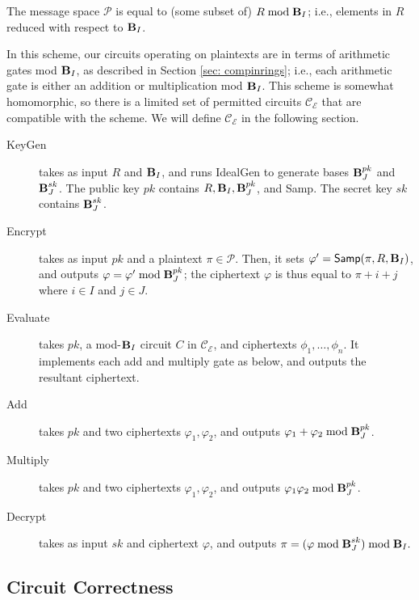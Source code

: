 The message space $\mathcal{P}$ is equal to (some subset of) $R \bmod \textbf{B}_I$; i.e., elements in $R$ reduced with respect to $\textbf{B}_I$.

In this scheme, our circuits operating on plaintexts are in terms of arithmetic gates mod $\textbf{B}_I$, as described in Section \ref{sec: compinrings}; i.e., each arithmetic gate is either an addition or multiplication mod $\textbf{B}_I$. This scheme is somewhat homomorphic, so there is a limited set of permitted circuits $\mathcal{C}_\mathcal{E}$ that are compatible with the scheme. We will define $\mathcal{C}_\mathcal{E}$ in the following section.


\begin{description}
\item[KeyGen] takes as input $R$ and $\textbf{B}_I$, and runs {\sf IdealGen} to generate bases $\textbf{B}_J^{pk}$ and $\textbf{B}_J^{sk}$. The public key $pk$ contains $R, \textbf{B}_I, \textbf{B}_J^{pk}$, and {\sf Samp}. The secret key $sk$ contains $\textbf{B}_J^{sk}$.

\item[Encrypt] takes as input $pk$ and a plaintext $\pi \in \mathcal{P}$. Then, it sets $\varphi' = {\sf Samp}(\pi, R, \textbf{B}_I)$, and outputs $\varphi = \varphi' \bmod \textbf{B}_J^{pk}$; the ciphertext $\varphi$ is thus equal to $\pi + i + j$ where $i \in I$ and $j \in J$.

\item[Evaluate] takes $pk$, a mod-$\textbf{B}_I$ circuit $C$ in $\mathcal{C}_\mathcal{E}$, and ciphertexts $\phi_1, \dots, \phi_n$. It implements each add and multiply gate as below, and outputs the resultant ciphertext.

\item[Add] takes $pk$ and two ciphertexts $\varphi_1, \varphi_2$, and outputs $\varphi_1 + \varphi_2 \bmod \textbf{B}_J^{pk}$.

\item[Multiply] takes $pk$ and two ciphertexts $\varphi_1, \varphi_2$, and outputs $\varphi_1 \varphi_2 \bmod \textbf{B}_J^{pk}$.

\item[Decrypt] takes as input $sk$ and ciphertext $\varphi$, and outputs $\pi = (\varphi \bmod \textbf{B}_J^{sk}) \bmod \textbf{B}_I.$
\end{description}

\subsection{Circuit Correctness} \label{sec: circuitcorr}

